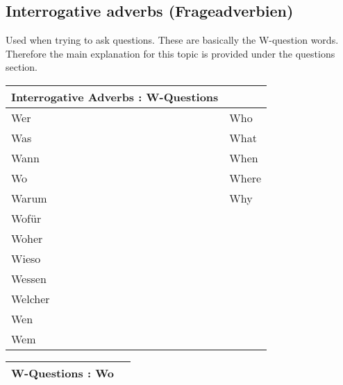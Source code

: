 \documentclass[a4paper,12pt]{article}
\begin{document}
\subsection{\bf{Interrogative adverbs (Frageadverbien)}}
\begin{adjustwidth}{2em}{0pt}
\label{sec:interrogative_adverbs}

Used when trying to ask questions. These are basically the W-question words.
Therefore the main explanation for this topic is provided under the questions
section.

\begin{minipage}{.6\linewidth}
\vspace{0.3cm}
\begin{tabular}{l|l}
\toprule
\rowcolor{goethe_green}
\multicolumn{2}{c}
{\color{white} \textbf{Interrogative Adverbs : W-Questions} \color{black}} \\
\midrule

\rowcolor{white}     Wer   & Who\\
\rowcolor{lightgray} Was   & What\\
\rowcolor{white}     Wann  & When\\
\rowcolor{lightgray} Wo    & Where\\
\rowcolor{white}     Warum & Why\\


\rowcolor{lightgray} Wofür   & \\
\rowcolor{white}     Woher &  \\
\rowcolor{lightgray} Wieso &  \\
\rowcolor{white}     Wessen &  \\
\rowcolor{lightgray} Welcher &  \\
\rowcolor{white}     Wen &  \\
\rowcolor{lightgray} Wem &  \\

\bottomrule
\end{tabular}
\vspace{0.3cm}
\newline
\end{minipage}
\begin{minipage}{.5\linewidth}
\vspace{0.3cm}
\begin{tabular}{l|l}
\toprule
\rowcolor{goethe_green}
\multicolumn{2}{c}
{\color{white} \textbf{W-Questions : Wo} \color{black}} \\
\midrule


\end{tabular}
\end{minipage}
\end{adjustwidth}
\end{document}
